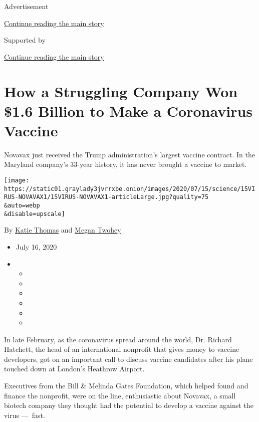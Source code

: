 Advertisement

\protect\hyperlink{after-top}{Continue reading the main story}

Supported by

\protect\hyperlink{after-sponsor}{Continue reading the main story}

\hypertarget{how-a-struggling-company-won-16-billion-to-make-a-coronavirus-vaccine}{%
\section{How a Struggling Company Won \$1.6 Billion to Make a
Coronavirus
Vaccine}\label{how-a-struggling-company-won-16-billion-to-make-a-coronavirus-vaccine}}

Novavax just received the Trump administration's largest vaccine
contract. In the Maryland company's 33-year history, it has never
brought a vaccine to market.

\texttt{[image: https://static01.graylady3jvrrxbe.onion/images/2020/07/15/science/15VIRUS-NOVAVAX1/15VIRUS-NOVAVAX1-articleLarge.jpg?quality=75\\\&auto=webp\\\&disable=upscale]}

By \href{https://www.nytimes3xbfgragh.onion/by/katie-thomas}{Katie
Thomas} and
\href{https://www.nytimes3xbfgragh.onion/by/megan-twohey}{Megan Twohey}

\begin{itemize}
\item
  July 16, 2020
\item
  \begin{itemize}
  \item
  \item
  \item
  \item
  \item
  \item
  \end{itemize}
\end{itemize}

In late February, as the coronavirus spread around the world, Dr.
Richard Hatchett, the head of an international nonprofit that gives
money to vaccine developers, got on an important call to discuss vaccine
candidates after his plane touched down at London's Heathrow Airport.

Executives from the Bill \& Melinda Gates Foundation, which helped found
and finance the nonprofit, were on the line, enthusiastic about Novavax,
a small biotech company they thought had the potential to develop a
vaccine against the virus ---~fast.

